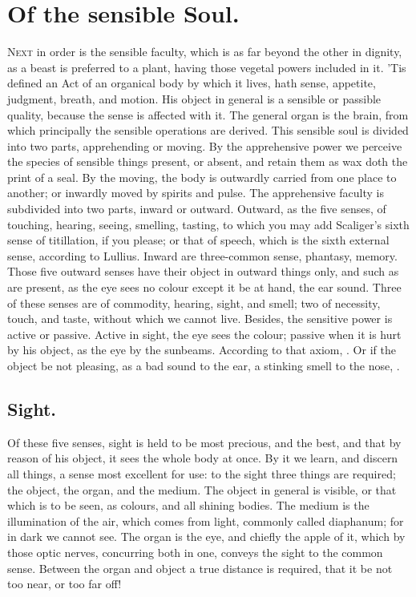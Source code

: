 {%
\section{Of the sensible Soul.}

\lettrine{N}{ext} in order is the sensible faculty, which is as far beyond the other
in dignity, as a beast is preferred to a plant, having those vegetal
powers included in it. 'Tis defined an Act of an organical body by
which it lives, hath sense, appetite, judgment, breath, and motion. His
object in general is a sensible or passible quality, because the sense
is affected with it. The general organ is the brain, from which
principally the sensible operations are derived. This sensible soul is
divided into two parts, apprehending or moving. By the apprehensive
power we perceive the species of sensible things present, or absent,
and retain them as wax doth the print of a seal. By the moving, the
body is outwardly carried from one place to another; or inwardly moved
by spirits and pulse. The apprehensive faculty is subdivided into two
parts, inward or outward. Outward, as the five senses, of touching,
hearing, seeing, smelling, tasting, to which you may add Scaliger's
sixth sense of titillation, if you please; or that of speech, which is
the sixth external sense, according to Lullius. Inward are three-common
sense, phantasy, memory. Those five outward senses have their object in
outward things only, and such as are present, as the eye sees no colour
except it be at hand, the ear sound. Three of these senses are of
commodity, hearing, sight, and smell; two of necessity, touch, and
taste, without which we cannot live. Besides, the sensitive power is
active or passive. Active in sight, the eye sees the colour; passive
when it is hurt by his object, as the eye by the sunbeams. According to
that axiom, . Or if the object be
not pleasing, as a bad sound to the ear, a stinking smell to the nose,
\etc{}.
\subsection{Sight.}
Of these five senses, sight is held to be most precious, and
the best, and that by reason of his object, it sees the whole body at
once. By it we learn, and discern all things, a sense most excellent
for use: to the sight three things are required; the object, the organ,
and the medium. The object in general is visible, or that which is to
be seen, as colours, and all shining bodies. The medium is the
illumination of the air, which comes from light, commonly called
diaphanum; for in dark we cannot see. The organ is the eye, and chiefly
the apple of it, which by those optic nerves, concurring both in one,
conveys the sight to the common sense. Between the organ and object a
true distance is required, that it be not too near, or too far off!

}
